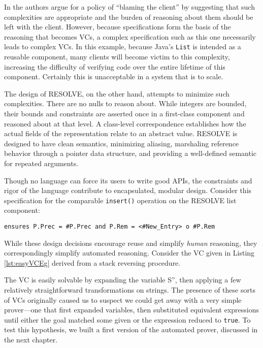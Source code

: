 In \cite{filipovic2010blaming} the authors argue for a policy of ``blaming the client'' by suggesting that such complexities are appropriate and the burden of reasoning about them should be left with the client.  However,  because specifications form the basis of the reasoning that becomes VCs, a complex specification such as this one necessarily leads to complex VCs.  In this example, because Java's \texttt{List} is intended as a reusable component, many clients will become victim to this complexity, increasing the difficulty of verifying code over the entire lifetime of this component.  Certainly this is unacceptable in a system that is to scale.

The design of RESOLVE, on the other hand, attempts to minimize such complexities.  There are no nulls to reason about.  While integers are bounded, their bounds and constraints are asserted once in a first-class component and reasoned about at that level.  A class-level correspondence establishes how the actual fields of the representation relate to an abstract value.  RESOLVE is designed to have clean semantics\cite{kul:dis}, minimizing aliasing, marshaling reference behavior through a pointer data structure, and providing a well-defined semantic for repeated arguments.

Though no language can force its users to write good APIs, the constraints and rigor of the language contribute to encapsulated, modular design.  Consider this specification for the comparable \texttt{insert()} operation on the RESOLVE list component:

\begin{lstlisting}[language=RESOLVE]
	ensures P.Prec = #P.Prec and P.Rem = <#New_Entry> o #P.Rem
\end{lstlisting}

While these design decisions encourage reuse and simplify \emph{human} reasoning, they correspondingly simplify automated reasoning.  Consider the VC given in Listing \ref{lst:easyVCEg} derived from a stack reversing procedure.



The VC is easily solvable by expanding the variable S'', then applying a few relatively straightforward transformations on strings.  The presence of these sorts of VCs originally caused us to suspect we could get away with a very simple prover---one that first expanded variables, then substituted equivalent expressions until either the goal matched some given or the expression reduced to \texttt{true}.  To test this hypothesis, we built a first version of the automated prover, discussed in the next chapter.


